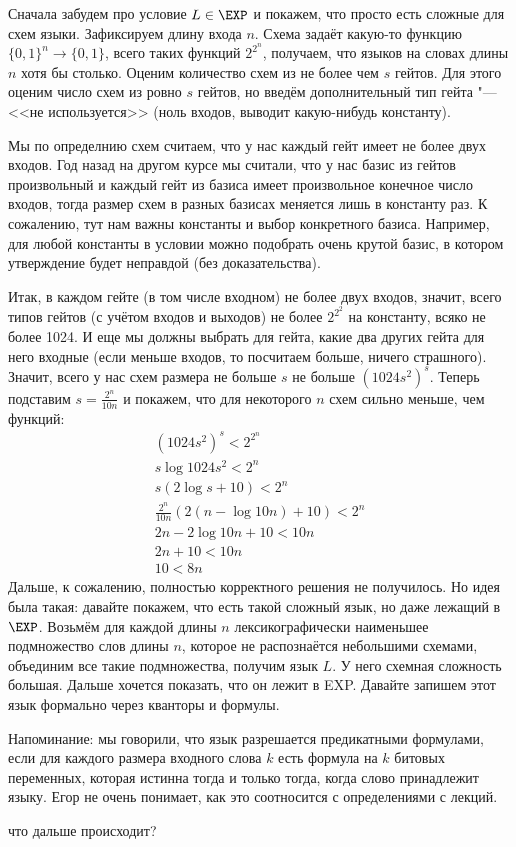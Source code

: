 	Сначала забудем про условие $L \in \EXP$ и покажем, что просто есть сложные для схем языки.
	Зафиксируем длину входа $n$.
	Схема задаёт какую-то функцию $\{0, 1\}^n \to \{0, 1\}$, всего таких функций $2^{2^n}$,
	получаем, что языков на словах длины $n$ хотя бы столько.
	Оценим количество схем из не более чем $s$ гейтов.
	Для этого оценим число схем из ровно $s$ гейтов, но введём дополнительный тип гейта "--- <<не используется>>
	(ноль входов, выводит какую-нибудь константу).
	\begin{Rem}
		Мы по определнию схем считаем, что у нас каждый гейт имеет не более двух входов.
		Год назад на другом курсе мы считали, что у нас базис из гейтов произвольный и каждый гейт
		из базиса имеет произвольное конечное число входов, тогда размер схем в разных базисах
		меняется лишь в константу раз.
		К сожалению, тут нам важны константы и выбор конкретного базиса.
		Например, для любой константы в условии можно подобрать очень крутой базис, в котором
		утверждение будет неправдой (без доказательства).
	\end{Rem}
	Итак, в каждом гейте (в том числе входном) не более двух входов, значит, всего типов гейтов
	(с учётом входов и выходов) не более $2^{2^2}$ на константу, всяко не более 1024.
	И еще мы должны выбрать для гейта, какие два других гейта для него входные
	(если меньше входов, то посчитаем больше, ничего страшного).
	Значит, всего у нас схем размера не больше $s$ не больше $(1024s^2)^s$.
	Теперь подставим $s=\frac{2^n}{10n}$ и покажем, что для некоторого $n$ схем сильно меньше, чем функций:
	\begin{gather*}
		(1024s^2)^s < 2^{2^n} \\
		s \log 1024s^2 < 2^n \\
		s (2\log s + 10) < 2^n \\
		\frac{2^n}{10n} (2(n-\log 10n) + 10) < 2^n \\
		2n-2\log 10n + 10 < 10n \\
		2n + 10 < 10n \\
		10 < 8n
	\end{gather*}
	Дальше, к сожалению, полностью корректного решения не получилось.
	Но идея была такая: 
	давайте покажем, что есть такой сложный язык, но даже лежащий в $\EXP$.
	Возьмём для каждой длины $n$ лексикографически наименьшее подмножество слов длины $n$,
	которое не распознаётся небольшими схемами, объединим все такие подмножества, получим язык $L$.
	У него схемная сложность большая.
	Дальше хочется показать, что он лежит в EXP.
	Давайте запишем этот язык формально через кванторы и формулы.
	\begin{Rem}
		Напоминание: мы говорили, что язык разрешается предикатными формулами, если
		для каждого размера входного слова $k$ есть формула на $k$ битовых переменных,
		которая истинна тогда и только тогда, когда слово принадлежит языку.
		\TODO Егор не очень понимает, как это соотносится с определениями с лекций.
	\end{Rem}
	\TODO что дальше происходит?

